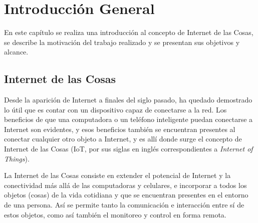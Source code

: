 
\chapter{Introducción General} %

\label{Chapter1} %
\label{IntroGeneral}


\newcommand{\keyword}[1]{\textbf{#1}}
\newcommand{\tabhead}[1]{\textbf{#1}}
\newcommand{\code}[1]{\texttt{#1}}
\newcommand{\file}[1]{\texttt{\bfseries#1}}
\newcommand{\option}[1]{\texttt{\itshape#1}}
\newcommand{\grados}{$^{\circ}$}




En este capítulo se realiza una introducción al concepto de Internet de las Cosas, se describe la motivación del trabajo realizado y se presentan sus objetivos y alcance.

\section{Internet de las Cosas{}}

Desde la aparición de Internet a finales del siglo pasado, ha quedado demostrado lo útil que es contar con un dispositivo capaz de conectarse a la red. Los beneficios de que una computadora o un teléfono inteligente puedan conectarse a Internet son evidentes, y esos beneficios también se encuentran presentes al conectar cualquier otro objeto a Internet, y es allí donde surge el concepto de Internet de las Cosas (IoT, por sus siglas en inglés correspondientes a \emph{Internet of Things}).

La Internet de las Cosas consiste en extender el potencial de Internet y la conectividad más allá de las computadoras y celulares, e incorporar a todos los objetos (cosas) de la vida cotidiana y que se encuentran presentes en el entorno de una persona. Así se permite tanto la comunicación e interacción entre sí de estos objetos, como así también el monitoreo y control en forma remota.

